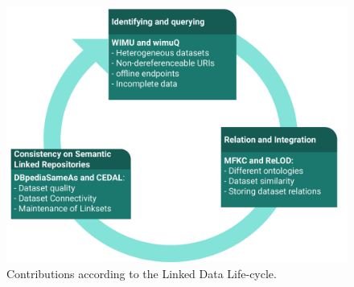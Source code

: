 

\begin{figure}[htb] 
\centering
\includegraphics[width=1.0\linewidth]{sections/img/lifeThesis.pdf}
\caption{Contributions according to the Linked Data Life-cycle.}
\label{fig:lifecycle}
\end{figure} 

